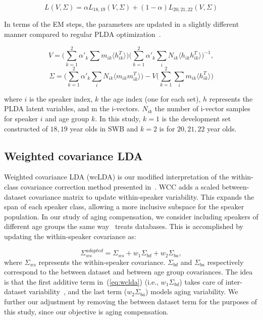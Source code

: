 \documentclass[a4paper]{article}
\begin{document}
\begin{equation}
\label{eq:wlPLDA}
L(V,\Sigma) = \alpha L_{18,19}(V,\Sigma) + (1-\alpha) L_{20,21,22}(V,\Sigma) 
\end{equation}

In terms of the EM steps, the parameters are updated in a slightly different manner compared to regular PLDA optimization~\cite{garcia2014supervised}.

\begin{equation}
\label{eq:wlPLDA-V}
V = \big ( \sum_{k=1}^2\alpha'_k\sum{m_{ik}\langle h_{ik}^T\rangle}\big ) \big ( \sum_{k=1}^2 \alpha'_k \sum_i N_{ik} \langle h_{ik}h_{ik}^T\rangle\big )^{-1},
\end{equation}
\begin{equation}
\label{eq:wlPLDA-S}
\Sigma = \big (  \sum_{k=1}^2 \alpha'_k \sum_i N_{ik} \langle m_{ik}m_{ik}^T\rangle \big ) - V\big ( \sum_{k=1}^2 \sum_i m_{ik}\langle h_{ik}^T\rangle\big )
\end{equation}
  
where $i$ is the speaker index, $k$ the age index (one for each set), $h$ represents the PLDA latent variables, and m the i-vectors. $N_{ik}$ the number of i-vector samples for speaker $i$ and age group $k$. In this study, $k = 1$ is the development set constructed of $18,19$ year olds in SWB and $k=2$ is for $20,21,22$ year olds.  


\subsection{Weighted covariance LDA}
Weighted covariance LDA (wcLDA) is our modified interpretation of the within-class covariance correction method presented in~\cite{weightedLDA}. WCC adds a scaled between-dataset covariance matrix to update within-speaker variability. This expands the span of each speaker class, allowing a more inclusive subspace for the speaker population. In our study of aging compensation, we consider including speakers of different age groups the same way~\cite{weightedLDA} treats databases. This is accomplished by updating the within-speaker covariance as:

\begin{equation}
\label{eq:wclda}
\Sigma_{ws}^{adapted} = \Sigma_{ws} + w_1\Sigma_{bd} + w_2\Sigma_{ba},
\end{equation}
where $\Sigma_{ws}$ represents the within-speaker covariance. $\Sigma_{bd}$ and $\Sigma_{ba}$ respectively correspond to the between dataset and between age group covariances. The idea is that the first additive term in~(\ref{eq:wclda}) (i.e., $w_1\Sigma_{bd}$) takes care of inter-dataset variability~\cite{misra2016odyssey}, and the last term ($w_2\Sigma_{ba}$) models aging variability. We further our adjustment by removing the between dataset term for the purposes of this study, since our objective is aging compensation.  
\end{document}
